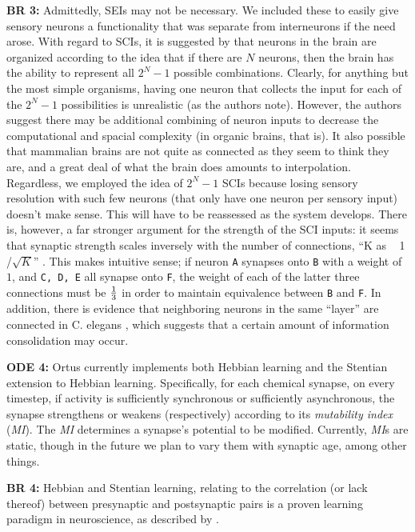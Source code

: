 \documentclass[letterpaper]{article}
\begin{document}
\textbf{BR 3:} Admittedly, SEIs may not be necessary. We included these to easily give sensory neurons a functionality that was separate from interneurons if the need arose. With regard to SCIs, it is suggested by \citet{Xie2016} that neurons in the brain are organized according to the idea that if there are $N$ neurons, then the brain has the ability to represent all $2^N-1$ possible combinations.
Clearly, for anything but the most simple organisms, having one neuron that collects the input for each of the $2^N-1$ possibilities is unrealistic (as the authors note).
However, the authors suggest there may be additional combining of neuron inputs to decrease the computational and spacial complexity (in organic brains, that is).
It also possible that mammalian brains are not quite as connected as they seem to think they are, and a great deal of what the brain does amounts to interpolation.
Regardless, we employed the idea of $2^N-1$ SCIs because losing sensory resolution with such few neurons (that only have one neuron per sensory input) doesn't make sense.
This will have to be reassessed as the system develops.
There is, however, a far stronger argument for the strength of the SCI inputs: it seems that synaptic strength scales inversely with the number of connections, ``K as ~ 1 /$\sqrt{K}$'' \citep{Barral2016}. This makes intuitive sense; if neuron \texttt{A} synapses onto \texttt{B} with a weight of $1$, and \texttt{C, D, E} all synapse onto \texttt{F}, the weight of each of the latter three connections must be $1 \over 3$ in order to maintain equivalence between \texttt{B} and \texttt{F}. In addition, there is evidence that neighboring neurons in the same ``layer'' are connected in C. elegans \citep{Azulay2016}, which suggests that a certain amount of information consolidation may occur.


\textbf{ODE 4:} Ortus currently implements both Hebbian learning and the Stentian extension to Hebbian learning. Specifically, for each chemical synapse, on every timestep, if activity is sufficiently synchronous or sufficiently asynchronous, the synapse strengthens or weakens (respectively) according to its \textit{mutability index} (\textit{MI}). The \textit{MI} determines a synapse's potential to be modified. Currently, \textit{MI}s are static, though in the future we plan to vary them with synaptic age, among other things.

\textbf{BR 4:} Hebbian and Stentian learning, relating to the correlation (or lack thereof) between presynaptic and postsynaptic pairs is a proven learning paradigm in neuroscience, as described by \citet{Kutsarova2016}.
\end{document}
